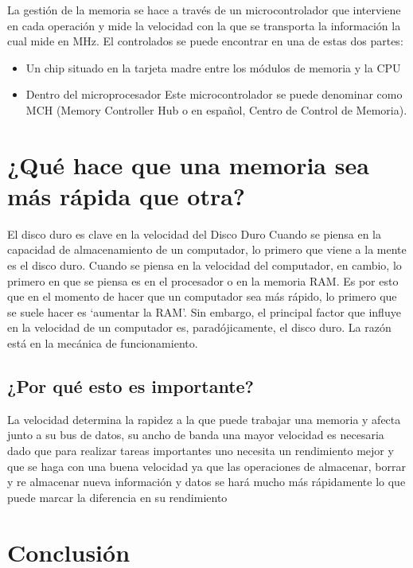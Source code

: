 \documentclass{article}
\begin{document}
La gestión de la memoria se hace a través de un microcontrolador que interviene en cada operación y mide la velocidad con la que se transporta la información la cual mide en MHz. El controlados se puede encontrar en una de estas dos partes:
\begin{itemize}
\item{ Un chip situado en la tarjeta madre entre los módulos de memoria y la CPU}
\end{itemize}

\begin{itemize}
\item{ Dentro del microprocesador Este microcontrolador se puede denominar como MCH (Memory Controller Hub o en español, Centro de Control de Memoria).}
\end{itemize}


\section{¿Qué hace que una memoria sea más rápida que otra?}

El disco duro es clave en la velocidad del Disco Duro Cuando se piensa en la capacidad de almacenamiento de un computador, lo primero que viene a la mente es el disco duro. Cuando se piensa en la velocidad del computador, en cambio, lo primero en que se piensa es en el procesador o en la memoria RAM. Es por esto que en el momento de hacer que un computador sea más rápido, lo primero que se suele hacer es ‘aumentar la RAM’. Sin embargo, el principal factor que influye en la velocidad de un computador es, paradójicamente, el disco duro. La razón está en la mecánica de funcionamiento.\cite{SILO.TIPS}


\subsection{¿Por qué esto es importante?}

La velocidad determina la rapidez a la que puede trabajar una memoria y afecta junto a su bus de datos, su ancho de banda una mayor velocidad es necesaria dado que para realizar tareas importantes uno necesita un rendimiento mejor y que se haga con una buena velocidad ya que las operaciones de almacenar, borrar y re almacenar nueva información y datos se hará mucho más rápidamente lo que puede marcar la diferencia en su rendimiento



\section{Conclusión} \label{conclulsion}
\end{document}
